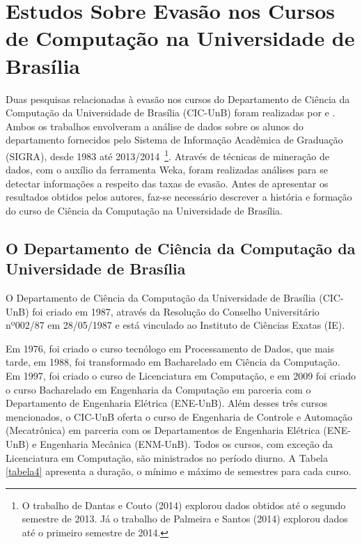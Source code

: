 \section{Estudos Sobre Evasão nos Cursos de Computação na Universidade de Brasília} \label{2title5}

Duas pesquisas relacionadas à evasão nos cursos do Departamento de Ciência da Computação da Universidade de Brasília (CIC-UnB) foram realizadas por \citet{dantas2014} e \citet{palmeira_santos2014}. Ambos os trabalhos envolveram a análise de dados sobre os alunos do departamento fornecidos pelo Sistema de Informação Acadêmica de Graduação (SIGRA), desde 1983 até 2013/2014~\footnote{O trabalho de Dantas e Couto (2014) explorou dados obtidos até o segundo semestre de 2013. Já o trabalho de Palmeira e Santos (2014) explorou dados até o primeiro semestre de 2014.}. Através de técnicas de mineração de dados, com o auxílio da ferramenta Weka, foram realizadas análises para se detectar informações a respeito das taxas de evasão. Antes de apresentar os resultados obtidos pelos autores, faz-se necessário descrever a história e formação do curso de Ciência da Computação na Universidade de Brasília.

\subsection{O Departamento de Ciência da Computação da Universidade de Brasília} \label{2title51}

O Departamento de Ciência da Computação da Universidade de Brasília (CIC-UnB) foi criado em 1987, através da Resolução do Conselho Universitário nº002/87 em 28/05/1987 e está vinculado ao Instituto de Ciências Exatas (IE). 

Em 1976, foi criado o curso tecnólogo em Processamento de Dados, que mais tarde, em 1988, foi transformado em Bacharelado em Ciência da Computação. Em 1997, foi criado o curso de Licenciatura em Computação, e em 2009 foi criado o curso Bacharelado em Engenharia da Computação em parceria com o Departamento de Engenharia Elétrica (ENE-UnB). Além desses três cursos mencionados, o CIC-UnB oferta o curso de Engenharia de Controle e Automação (Mecatrônica) em parceria com os Departamentos de Engenharia Elétrica (ENE-UnB) e Engenharia Mecânica (ENM-UnB). Todos os cursos, com exceção da Licenciatura em Computação, são ministrados no período diurno. A Tabela \ref{tabela4} apresenta a duração, o mínimo e máximo de semestres para cada curso.

